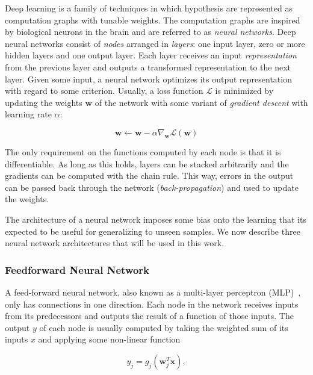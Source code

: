 Deep learning is a family of techniques in which hypothesis are represented as computation graphs with tunable weights.
The computation graphs are inspired by biological neurons in the brain and are referred to as \textit{neural networks}.
Deep neural networks consist of \textit{nodes} arranged in \textit{layers}: one input layer, zero or more hidden layers and one output layer.
Each layer receives an input \textit{representation}~\cite{bengio_representation_2014} from the previous layer and outputs a transformed representation to the next layer.
Given some input, a neural network optimizes its output representation with regard to some criterion.
Usually, a loss function \(\mathcal{L}\) is minimized by updating the weights \(\mathbf{w}\) of the network with some variant of \textit{gradient descent} with learning rate \(\alpha\):

\begin{equation}
    \mathbf{w} \leftarrow \mathbf{w} - \alpha \nabla_\mathbf{w} \mathcal{L}(\mathbf{w}) 
\end{equation}

The only requirement on the functions computed by each node is that it is differentiable.
As long as this holds, layers can be stacked arbitrarily and the gradients can be computed with the chain rule.
This way, errors in the output can be passed back through the network (\textit{back-propagation}) and used to update the weights.~\cite{russell_artificial_2021,goodfellow_deep_2016}

The architecture of a neural network imposes some bias onto the learning that its expected to be useful for generalizing to unseen samples.
We now describe three neural network architectures that will be used in this work.

\subsubsection{Feedforward Neural Network}

A feed-forward neural network, also known as a multi-layer perceptron (MLP)~\cite{goodfellow_deep_2016}, only has connections in one direction.
Each node in the network receives inputs from its predecessors and outputs the result of a function of those inputs.
The output \(y\) of each node is usually computed by taking the weighted sum of its inputs \(x\) and applying some non-linear function

\begin{equation}
    y_j = g_j(\mathbf{w}_j^T \mathbf{x}),
\end{equation}

